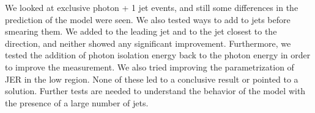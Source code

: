 We looked at exclusive photon + 1 jet events, and still some differences in the prediction of the \met model were seen. We also tested ways to add \met to jets before smearing them. We added \met to the leading jet and to the jet closest to the \met direction, and neither showed any significant improvement. Furthermore, we tested the addition of photon isolation energy back to the photon energy in order to improve the \met measurement. We also tried improving the parametrization of JER in the low \pt region. None of these led to a conclusive result or pointed to a solution. Further tests are needed to understand the behavior of the model with the presence of a large number of jets.


